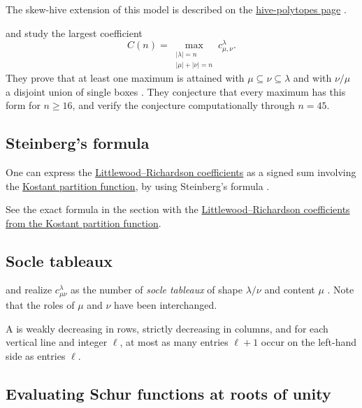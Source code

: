 The skew-hive extension of this model is described on the
\hyperref[skewHives]{hive-polytopes page} \cite{LeNguyen2026x}.

 and  study the largest coefficient
\[
 C(n)=\max_{\substack{|\lambda|=n\\|\mu|+|\nu|=n}}
 c^\lambda_{\mu,\nu}.
\]
They prove that at least one maximum is attained with
$\mu\subseteq\nu\subseteq\lambda$ and with $\nu/\mu$ a disjoint union of
single boxes \cite{PakSoskin2026x}.  They conjecture that every maximum has
this form for $n\geq16$, and verify the conjecture computationally through
$n=45$.




\subsection[steinbergLRFormula]{Steinberg's formula}

One can express the
\hyperref[schurLittlewoodRichardson]{Littlewood--Richardson coefficients}
as a signed sum involving the
\hyperref[kostantPartitionFunction]{Kostant partition function}, by using
Steinberg's formula \cite{Steinberg1961}.

See the exact formula in the section with the
\hyperref[littlewoodRichardsonFromKostant]
{Littlewood--Richardson coefficients from the Kostant partition function}.



\subsection[socleTableaux]{Socle tableaux}


 and  realize
$c^{\lambda}_{\mu\nu}$ as the number of \emph{socle tableaux} of shape
$\lambda/\nu$ and content $\mu$ \cite{KosakowskaSchmidmeier2022}.
Note that the roles of $\mu$ and $\nu$ have been interchanged.

A \label{socleTableau} is weakly decreasing in rows,
strictly decreasing in columns, and for each vertical line and integer $\ell$,
at most as many entries $\ell+1$ occur on the left-hand side as entries
$\ell$.


\subsection[lrExplicitFormula]{Evaluating Schur functions at roots of unity}

